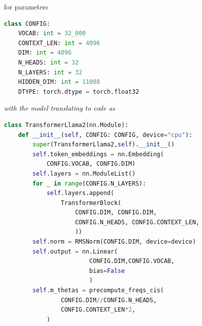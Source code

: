 \documentclass[12pt]{article}
\begin{document}
\begin{figure}[!htb]
\begin{minipage}[t]{0.98\textwidth}
\begin{minipage}{0.3\textwidth}
    for parameters
\begin{lstlisting}[language=python,style=python,basicstyle=\ttfamily\scriptsize]
class CONFIG:
    VOCAB: int = 32_000
    CONTEXT_LEN: int = 4096 
    DIM: int = 4096  
    N_HEADS: int = 32
    N_LAYERS: int = 32
    HIDDEN_DIM: int = 11008
    DTYPE: torch.dtype = torch.float32
\end{lstlisting}
\end{minipage}
\hspace{10pt}
\begin{minipage}{0.65\textwidth}
\vspace{1em}
{\it with the model translating to code as}
\begin{lstlisting}[language=python,style=python,basicstyle=\ttfamily\footnotesize]
class TransformerLlama2(nn.Module):
    def __init__(self, CONFIG: CONFIG, device="cpu"):
        super(TransformerLlama2,self).__init__()
        self.token_embeddings = nn.Embedding(
            CONFIG.VOCAB, CONFIG.DIM)
        self.layers = nn.ModuleList()
        for _ in range(CONFIG.N_LAYERS):
            self.layers.append(
                TransformerBlock(
                    CONFIG.DIM, CONFIG.DIM, 
                    CONFIG.N_HEADS, CONFIG.CONTEXT_LEN, 
                    ))
        self.norm = RMSNorm(CONFIG.DIM, device=device)
        self.output = nn.Linear(
                        CONFIG.DIM,CONFIG.VOCAB,
                        bias=False
                        )
        self.m_thetas = precompute_freqs_cis(
                CONFIG.DIM//CONFIG.N_HEADS,
                CONFIG.CONTEXT_LEN*2,
            )


\end{lstlisting}
\end{minipage}
\end{minipage}
\end{figure}
\end{document}
